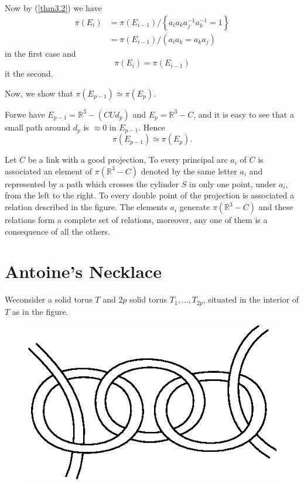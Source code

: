 \noindent
Now by (\ref{thm3.2}) we have 
\begin{align*}
\pi(E_i) & = \pi (E_{i-1}) / \left\{a_i a_k a^{-1}_j a^{-1}_k = 1 \right\}\\
 & = \pi (E_{i-1})  / (a_i a_k = a_k a_j)
\end{align*}
in the first case and 
$$
\pi (E_{i}) = \pi (E_{i-1}) 
$$
it the second.

Now, we show that $\pi (E_{p-1}) \simeq \pi (E_{p})$.

For\pageoriginale we have $E_{p-1} = \mathbb{R}^3 - (C U d_p)$ and $E_p =
\mathbb{R}^3 - C$, and it is easy to see that a small path around
$d_p$ is $\approx 0$ in $E_{p-1}$. Hence  
$$
\pi (E_{p-1}) \simeq \pi (E_{p}).
$$
 
\begin{theorem*}
Let $C$ be a link with a good projection, To every principal arc $a_i$
of $C$ is associated an element of $\pi(\mathbb{R}^3 -C)$ denoted by
the same letter $a_i$ and represented by a path which crosses the
cylinder $S$ in only one point, under $a_i$, from the left to the
right. To every double point of the projection is associated a
relation described in the figure. The elements $a_i$ generate
$\pi(\mathbb{R}^3 -C)$ and these relations form a complete set of
relations, moreover, any one of them is a consequence of all the
others. 
\end{theorem*}

\section{Antoine's Necklace}\label{sec6} %

We\pageoriginale consider a solid torus $T$ and $2p$ solid torus $T_1,
\ldots, T_{2p}$, situated in the interior of $T$ as in the figure.  
\begin{figure}[H]
\centering
\includegraphics{vol44-fig/fig44-8.eps}
\end{figure}

